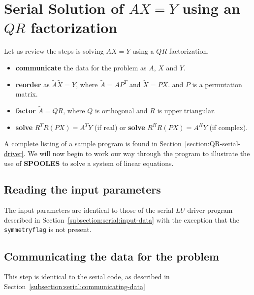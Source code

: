 \vfill \eject
\par
\section{Serial Solution of $A X = Y$ using an $QR$ factorization}
\label{section:QR-serial}
\par
Let us review the steps is solving $A X = Y$ using a $QR$
factorization.
\begin{itemize}
\item 
{\bf communicate} the data for the problem as $A$, $X$ and $Y$.
\item 
{\bf reorder} as
${\widetilde A} {\widetilde X} = Y$, where
${\widetilde A} = A P^T$ and
${\widetilde X} = P X$.
and $P$ is a permutation matrix.
\item 
{\bf factor} $ {\widetilde A} = Q R$,
where $Q$ is orthogonal and $R$ is upper triangular.
\item 
{\bf solve}  $R^T R (P X) = A^T Y$ (if real)
or {\bf solve}  $R^H R (P X) = A^H Y$ (if complex).
\end{itemize}
\par
A complete listing of a sample program 
is found in Section~\ref{section:QR-serial-driver}.
We will now begin to
work our way through the program to illustrate the use 
of {\bf SPOOLES} to solve a system of linear equations.  
\par
\subsection{Reading the input parameters}
\label{subsection:QR:input-data}
\par
The input parameters are identical to those of the serial $LU$
driver program described in
Section~\ref{subsection:serial:input-data}
with the exception that the {\tt symmetryflag} is not present.
\par
\subsection{Communicating the data for the problem}
\label{subsection:QR:communicating-data}
\par
This step is identical to the serial code, as described in
Section~\ref{subsection:serial:communicating-data}
\par
